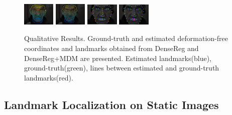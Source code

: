 \begin{figure}[h]
\includegraphics[width=0.13775\textwidth]{resources/Human_Poses/results/7/VGT}
\includegraphics[width=0.13775\textwidth]{resources/Human_Poses/results/7/Vreg}
\includegraphics[width=0.13775\textwidth]{resources/Human_Poses/results/7/Landmarks_alp}
\includegraphics[width=0.13775\textwidth]{resources/Human_Poses/results/7/Landmarks_MDM}



\caption{Qualitative Results. Ground-truth and estimated deformation-free coordinates and  landmarks obtained from DenseReg and DenseReg+MDM are presented. Estimated landmarks(blue), ground-truth(green), lines between estimated and ground-truth landmarks(red).}
\label{fig:qualitative}

\end{figure}

\subsection{Landmark Localization on Static Images}
\label{sec:exp_landmark_localization}

